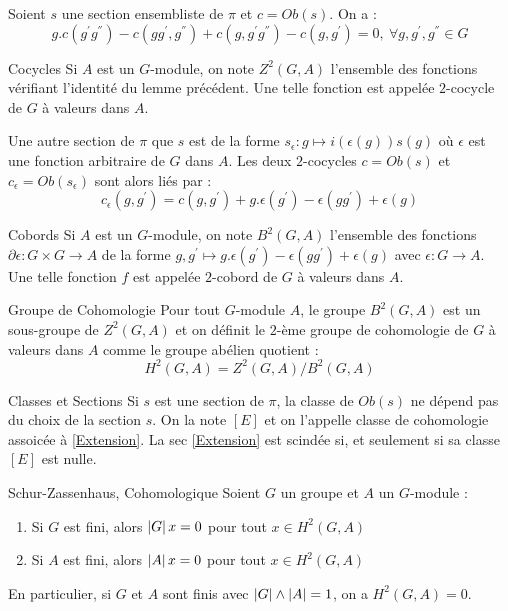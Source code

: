 \documentclass{cours}
\begin{document}
\begin{lemma}
    Soient $s$ une section ensembliste de $\pi$ et $c = Ob(s)$. On a :
    \[
        g.c(g^{'}g^{''}) - c(gg^{'}, g^{''}) + c(g, g^{'}g^{''}) - c(g, g^{'}) = 0, \ \forall g, g^{'}, g^{''} \in G
    \]
\end{lemma}

\begin{définition}{Cocycles}{}
    Si $A$ est un $G$-module, on note $Z^{2}(G, A)$ l'ensemble des fonctions vérifiant l'identité du lemme précédent. Une telle fonction est appelée $2$-cocycle de $G$ à valeurs dans $A$.
\end{définition}

Une autre section de $\pi$ que $s$ est de la forme $s_{\epsilon} : g \mapsto i(\epsilon(g))s(g)$ où $\epsilon$ est une fonction arbitraire de $G$ dans $A$. Les deux $2$-cocycles $c = Ob(s)$ et $c_{\epsilon} = Ob(s_{\epsilon})$ sont alors liés par :
\[
    c_{\epsilon}(g, g^{'}) = c(g, g^{'}) + g.\epsilon(g^{'}) - \epsilon(gg^{'}) + \epsilon(g)
\]

\begin{définition}{Cobords}{}
    Si $A$ est un $G$-module, on note $B^{2}(G, A)$ l'ensemble des fonctions $\partial\epsilon : G \times G \rightarrow A$ de la forme $g, g^{'} \mapsto g.\epsilon(g^{'}) - \epsilon(gg^{'}) + \epsilon(g)$ avec $\epsilon : G\rightarrow A$. Une telle fonction $f$ est appelée $2$-cobord de $G$ à valeurs dans $A$.
\end{définition}

\begin{définition}{Groupe de Cohomologie}{}
    Pour tout $G$-module $A$, le groupe $B^{2}(G, A)$ est un sous-groupe de $Z^{2}(G, A)$ et on définit le $2$-ème groupe de cohomologie de $G$ à valeurs dans $A$ comme le groupe abélien quotient :
    \[
        H^{2}(G, A) = Z^{2}(G, A)/B^{2}(G, A)
    \]
\end{définition}

\begin{propositionfr}{Classes et Sections}{}
    Si $s$ est une section de $\pi$, la classe de $Ob(s)$ ne dépend pas du choix de la section $s$. On la note $\left[E\right]$ et on l'appelle classe de cohomologie assoicée à \ref{Extension}. La sec \ref{Extension} est scindée si, et seulement si sa classe $\left[E\right]$ est nulle.
\end{propositionfr}

\begin{théorème}{Schur-Zassenhaus, Cohomologique}{}
    Soient $G$ un groupe et $A$ un $G$-module :
    \begin{enumerate}
        \item Si $G$ est fini, alors $\left|G\right|x = 0$ pour tout $x \in H^{2}(G, A)$
        \item Si $A$ est fini, alors $\left|A\right|x = 0$ pour tout $x \in H^{2}(G, A)$
    \end{enumerate}
    En particulier, si $G$ et $A$ sont finis avec $\left|G\right| \wedge \left|A\right| = 1$, on a $H^{2}(G, A) = 0$.
\end{théorème}
\end{document}

